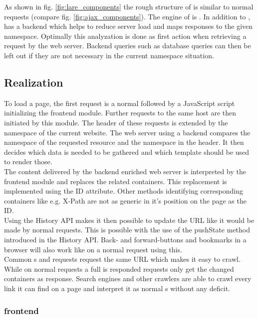 \noindent{}As shown in fig. \ref{fig:lare_components} the rough structure of \lare{} is similar to normal \ajax{} requests (compare fig. \ref{fig:ajax_components}).
The \ajax{} engine of \lare{} is \lareJS{}.
In addition to \ajax{}, \lare{} has a backend which helps to reduce server load and maps responses to the given namespace.
Optimally this analyzation is done as first action when retrieving a request by the web server.
Backend queries such as database queries can then be left out if they are not necessary in the current namespace situation.


\subsection{Realization}
To load a page, the first request is a normal \httpRequest{} followed by a JavaScript script initializing the \lare{} frontend module.
Further requests to the same host are then initiated by this module.
The \http{} header of these requests is extended by the namespace of the current website.
The web server using a \lare{} backend compares the namespace of the requested resource and the namespace in the \http{} header.
It then decides which data is needed to be gathered and which template should be used to render those.
\\
The content delivered by the \lare{} backend enriched web server is interpreted by the frontend module and replaces the related containers.
This replacement is implemented using the ID attribute.
Other methods identifying corresponding containers like e.g. X-Path are not as generic in it's position on the page as the ID.
\\
Using the History API makes it then possible to update the URL like it would be made by normal requests.
This is possible with the use of the pushState method introduced in the History API.
Back- and forward-buttons and bookmarks in a browser will also work like on a normal request using this.
\\
Common \httpRequest{}s and \lare{} requests request the same URL which makes it easy to crawl.
While on normal requests a full \webPage{} is responded \lare{} requests only get the changed containers as response.
Search engines and other crawlers are able to crawl every link it can find on a page and interpret it as normal \webPage{}s without any deficit.

\subsubsection{\lare{} frontend}

